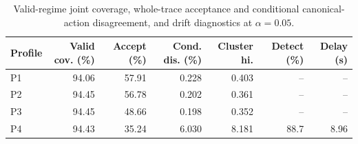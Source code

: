 
\begin{table}[t]
\caption{Valid-regime joint coverage, whole-trace acceptance and conditional canonical-action disagreement, and drift diagnostics at $\alpha=0.05$.}
\label{tab:selective}
\centering
\scriptsize
\setlength{\tabcolsep}{2.0pt}
\begin{tabular}{lrrrrrr}
\toprule
Profile & Valid cov. (\%) & Accept (\%) & Cond. dis. (\%) & Cluster hi. & Detect (\%) & Delay (s) \\
\midrule
P1 & 94.06 & 57.91 & 0.228 & 0.403 & -- & -- \\
P2 & 94.45 & 56.78 & 0.202 & 0.361 & -- & -- \\
P3 & 94.45 & 48.66 & 0.198 & 0.352 & -- & -- \\
P4 & 94.43 & 35.24 & 6.030 & 8.181 & 88.7 & 8.96 \\
\bottomrule
\end{tabular}
\end{table}

